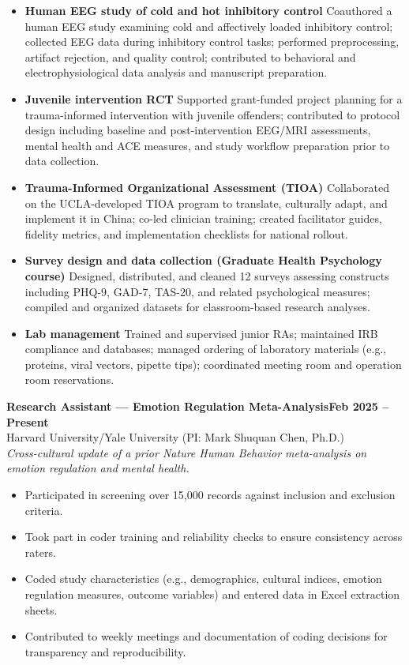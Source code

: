\documentclass[10pt, letterpaper]{article}
\newenvironment{expitems}{
    \begin{itemize}[
        leftmargin=8pt,
        itemsep=1pt,
        topsep=2pt,
        parsep=0pt,
        partopsep=0pt
    ]
}{\end{itemize}}
\newcommand{\expheading}[2]{\noindent\textbf{#1}\hfill\textbf{#2}\\}
\newcommand{\expinfo}[1]{\noindent #1\\}
\newcommand{\expscope}[1]{\noindent\textit{#1}\\}
\begin{document}
\begin{expitems}
  \item \textbf{Human EEG study of cold and hot inhibitory control} Coauthored a human EEG study examining cold and affectively loaded inhibitory control; collected EEG data during inhibitory control tasks; performed preprocessing, artifact rejection, and quality control; contributed to behavioral and electrophysiological data analysis and manuscript preparation.


\item \textbf{Juvenile intervention RCT} Supported grant-funded project planning for a trauma-informed intervention with juvenile offenders; contributed to protocol design including baseline and post-intervention EEG/MRI assessments, mental health and ACE measures, and study workflow preparation prior to data collection.

\item \textbf{Trauma-Informed Organizational Assessment (TIOA)} Collaborated on the UCLA-developed TIOA program to translate, culturally adapt, and implement it in China; co-led clinician training; created facilitator guides, fidelity metrics, and implementation checklists for national rollout.

  \item \textbf{Survey design and data collection (Graduate Health Psychology course)} Designed, distributed, and cleaned 12 surveys assessing constructs including PHQ-9, GAD-7, TAS-20, and related psychological measures; compiled and organized datasets for classroom-based research analyses.
  \item \textbf{Lab management} Trained and supervised junior RAs; maintained IRB compliance and databases; managed ordering of laboratory materials (e.g., proteins, viral vectors, pipette tips); coordinated meeting room and operation room reservations.
\end{expitems}

\vspace{2pt}
\expheading{Research Assistant — Emotion Regulation Meta-Analysis}{Feb 2025 -- Present}
\expinfo{Harvard University/Yale University (PI: Mark Shuquan Chen, Ph.D.)}
\vspace{3pt}
\expscope{Cross-cultural update of a prior \textit{Nature Human Behavior} meta-analysis on emotion regulation and mental health.}
\begin{expitems}
    \item Participated in screening over 15{,}000 records against inclusion and exclusion criteria.
    \item Took part in coder training and reliability checks to ensure consistency across raters.
    \item Coded study characteristics (e.g., demographics, cultural indices, emotion regulation measures, outcome variables) and entered data in Excel extraction sheets.
    \item Contributed to weekly meetings and documentation of coding decisions for transparency and reproducibility.
\end{expitems}
\end{document}
